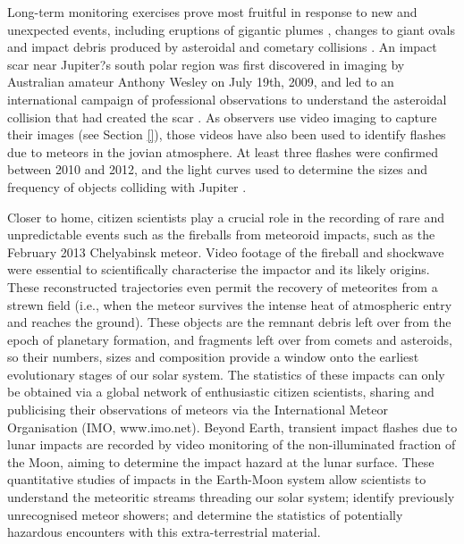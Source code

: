 \documentclass{ar2e}
\begin{document}
Long-term monitoring exercises prove most fruitful in response to new and
unexpected events, including eruptions of gigantic plumes \citep{08sanchez,
11fletcher}, changes to giant ovals \citep{06simon-miller} and impact debris
produced by asteroidal and cometary collisions \citep{10hammel}.  An impact
scar near Jupiter?s south polar region was first discovered in imaging by
Australian amateur Anthony Wesley on July 19th, 2009, and led to an
international campaign of professional observations to understand the
asteroidal collision that had created the scar
\citep[e.g.,][]{10depater,11orton}.  As observers use video imaging to capture
their images (see Section \ref{}), those videos have also been used to
identify flashes due to meteors in the jovian atmosphere.  At least three
flashes were confirmed between 2010 and 2012, and the light curves used to
determine the sizes and frequency of objects colliding with Jupiter
\citep[e.g.,][]{10hueso}. 

Closer to home, citizen scientists play a crucial role in the recording of
rare and unpredictable events such as the fireballs from meteoroid impacts,
such as the February 2013 Chelyabinsk meteor.  Video footage of the fireball
and shockwave were essential to scientifically characterise the impactor and
its likely origins.  These reconstructed trajectories even permit the recovery
of meteorites from a strewn field (i.e., when the meteor survives the intense
heat of atmospheric entry and reaches the ground).  These objects are the
remnant debris left over from the epoch of planetary formation, and fragments
left over from comets and asteroids, so their numbers, sizes and composition
provide a window onto the earliest evolutionary stages of our solar system. 
The statistics of these impacts can only be obtained via a global network of
enthusiastic citizen scientists, sharing and publicising their observations of
meteors via the International Meteor Organisation (IMO, www.imo.net).  Beyond
Earth, transient impact flashes due to lunar impacts are recorded by video
monitoring of the non-illuminated fraction of the Moon, aiming to determine
the impact hazard at the lunar surface.  These quantitative studies of impacts
in the Earth-Moon system allow scientists to understand the meteoritic streams
threading our solar system; identify previously unrecognised meteor showers;
and determine the statistics of potentially hazardous encounters with this
extra-terrestrial material. 
 
\end{document}
